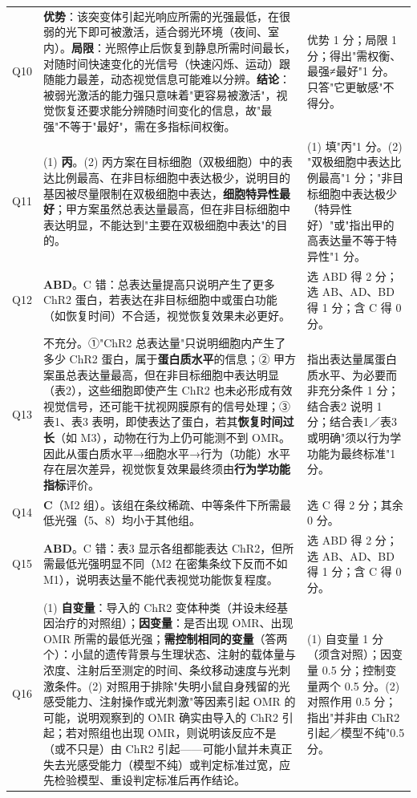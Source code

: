 \documentclass[UTF8,a4paper,11pt]{ctexart}
\begin{document}
\begin{longtable}{@{}p{0.85cm}p{9.7cm}p{4.2cm}@{}}
Q10 & \textbf{优势}：该突变体引起光响应所需的光强最低，在很弱的光下即可被激活，适合弱光环境（夜间、室内）。\textbf{局限}：光照停止后恢复到静息所需时间最长，对随时间快速变化的光信号（快速闪烁、运动）跟随能力最差，动态视觉信息可能难以分辨。\textbf{结论}：被弱光激活的能力强只意味着"更容易被激活"，视觉恢复还要求能分辨随时间变化的信息，故"最强"不等于"最好"，需在多指标间权衡。 & 优势 1 分；局限 1 分；得出"需权衡、最强≠最好"1 分。只答"它更敏感"不得分。 \\
\addlinespace
Q11 & (1) \textbf{丙}。(2) 丙方案在目标细胞（双极细胞）中的表达比例最高、在非目标细胞中表达极少，说明目的基因被尽量限制在双极细胞中表达，\textbf{细胞特异性最好}；甲方案虽然总表达量最高，但在非目标细胞中表达明显，不能达到"主要在双极细胞中表达"的目的。 & (1) 填"丙"1 分。(2) "双极细胞中表达比例最高"1 分；"非目标细胞中表达极少（特异性好）"或"指出甲的高表达量不等于特异性"1 分。 \\
\addlinespace
Q12 & \textbf{ABD}。C 错：总表达量提高只说明产生了更多 ChR2 蛋白，若表达在非目标细胞中或蛋白功能（如恢复时间）不合适，视觉恢复效果未必更好。 & 选 ABD 得 2 分；选 AB、AD、BD 得 1 分；含 C 得 0 分。 \\
\addlinespace
Q13 & 不充分。①"ChR2 总表达量"只说明细胞内产生了多少 ChR2 蛋白，属于\textbf{蛋白质水平}的信息；② 甲方案虽总表达量最高，但在非目标细胞中表达明显（表2），这些细胞即使产生 ChR2 也未必形成有效视觉信号，还可能干扰视网膜原有的信号处理；③ 表1、表3 表明，即使表达了蛋白，若其\textbf{恢复时间过长}（如 M3），动物在行为上仍可能测不到 OMR。因此从蛋白质水平→细胞水平→行为（功能）水平存在层次差异，视觉恢复效果最终须由\textbf{行为学功能指标}评价。 & 指出表达量属蛋白质水平、为必要而非充分条件 1 分；结合表2 说明 1 分；结合表1／表3 或明确"须以行为学功能为最终标准"1 分。 \\
\addlinespace
Q14 & \textbf{C}（M2 组）。该组在条纹稀疏、中等条件下所需最低光强（5、8）均小于其他组。 & 选 C 得 2 分；其余 0 分。 \\
\addlinespace
Q15 & \textbf{ABD}。C 错：表3 显示各组都能表达 ChR2，但所需最低光强明显不同（M2 在密集条纹下反而不如 M1），说明表达量不能代表视觉功能恢复程度。 & 选 ABD 得 2 分；选 AB、AD、BD 得 1 分；含 C 得 0 分。 \\
\addlinespace
Q16 & (1) \textbf{自变量}：导入的 ChR2 变体种类（并设未经基因治疗的对照组）；\textbf{因变量}：是否出现 OMR、出现 OMR 所需的最低光强；\textbf{需控制相同的变量}（答两个）：小鼠的遗传背景与生理状态、注射的载体量与浓度、注射后至测定的时间、条纹移动速度与光刺激条件。(2) 对照用于排除"失明小鼠自身残留的光感受能力、注射操作或光刺激"等因素引起 OMR 的可能，说明观察到的 OMR 确实由导入的 ChR2 引起；若对照组也出现 OMR，则说明该反应不是（或不只是）由 ChR2 引起——可能小鼠并未真正失去光感受能力（模型不纯）或判定标准过宽，应先检验模型、重设判定标准后再作结论。 & (1) 自变量 1 分（须含对照）；因变量 0.5 分；控制变量两个 0.5 分。(2) 对照作用 0.5 分；指出"并非由 ChR2 引起／模型不纯"0.5 分。 \\

\end{longtable}
\end{document}
